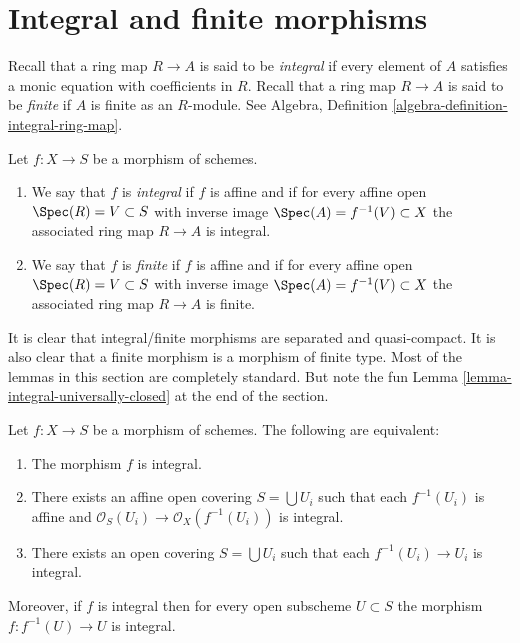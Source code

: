\section{Integral and finite morphisms}
\label{section-integral}

\noindent
Recall that a ring map $R \to A$ is said to be {\it integral}
if every element of $A$ satisfies a monic equation with
coefficients in $R$. Recall that a ring map $R \to A$ is
said to be {\it finite} if $A$ is finite as an $R$-module.
See Algebra, Definition \ref{algebra-definition-integral-ring-map}.

\begin{definition}
\label{definition-integral}
Let $f : X \to S$ be a morphism of schemes.
\begin{enumerate}
\item We say that $f$ is {\it integral} if $f$ is affine
and if for every affine open $\Spec(R) = V \subset S$
with inverse image $\Spec(A) = f^{-1}(V) \subset X$
the associated ring map $R \to A$ is integral.
\item We say that $f$ is {\it finite} if $f$ is affine
and if for every affine open $\Spec(R) = V \subset S$
with inverse image $\Spec(A) = f^{-1}(V) \subset X$
the associated ring map $R \to A$ is finite.
\end{enumerate}
\end{definition}

\noindent
It is clear that integral/finite morphisms are separated and
quasi-compact. It is also clear that a finite morphism is a
morphism of finite type. Most of the lemmas in this section are
completely standard.
But note the fun Lemma \ref{lemma-integral-universally-closed}
at the end of the section.

\begin{lemma}
\label{lemma-integral-local}
Let $f : X \to S$ be a morphism of schemes.
The following are equivalent:
\begin{enumerate}
\item The morphism $f$ is integral.
\item There exists an affine open covering $S = \bigcup U_i$ such that
each $f^{-1}(U_i)$ is affine and
$\mathcal{O}_S(U_i) \to \mathcal{O}_X(f^{-1}(U_i))$ is integral.
\item There exists an open covering $S = \bigcup U_i$
such that each $f^{-1}(U_i) \to U_i$ is integral.
\end{enumerate}
Moreover, if $f$ is integral then for every open subscheme
$U \subset S$ the morphism $f : f^{-1}(U) \to U$ is integral.
\end{lemma}


